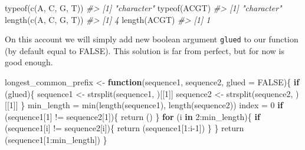\documentclass[
]{book}
\newenvironment{Shaded}{\begin{snugshade}}{\end{snugshade}}
\newcommand{\AttributeTok}[1]{\textcolor[rgb]{0.77,0.63,0.00}{#1}}
\newcommand{\CommentTok}[1]{\textcolor[rgb]{0.56,0.35,0.01}{\textit{#1}}}
\newcommand{\ConstantTok}[1]{\textcolor[rgb]{0.00,0.00,0.00}{#1}}
\newcommand{\ControlFlowTok}[1]{\textcolor[rgb]{0.13,0.29,0.53}{\textbf{#1}}}
\newcommand{\DecValTok}[1]{\textcolor[rgb]{0.00,0.00,0.81}{#1}}
\newcommand{\FunctionTok}[1]{\textcolor[rgb]{0.00,0.00,0.00}{#1}}
\newcommand{\NormalTok}[1]{#1}
\newcommand{\OtherTok}[1]{\textcolor[rgb]{0.56,0.35,0.01}{#1}}
\newcommand{\SpecialCharTok}[1]{\textcolor[rgb]{0.00,0.00,0.00}{#1}}
\newcommand{\StringTok}[1]{\textcolor[rgb]{0.31,0.60,0.02}{#1}}
\begin{document}
\begin{Shaded}
\begin{Highlighting}[]
\FunctionTok{typeof}\NormalTok{(}\FunctionTok{c}\NormalTok{(}\StringTok{\textquotesingle{}A\textquotesingle{}}\NormalTok{, }\StringTok{\textquotesingle{}C\textquotesingle{}}\NormalTok{, }\StringTok{\textquotesingle{}G\textquotesingle{}}\NormalTok{, }\StringTok{\textquotesingle{}T\textquotesingle{}}\NormalTok{))}
\CommentTok{\#\textgreater{} [1] "character"}
\FunctionTok{typeof}\NormalTok{(}\StringTok{\textquotesingle{}ACGT\textquotesingle{}}\NormalTok{)}
\CommentTok{\#\textgreater{} [1] "character"}
\FunctionTok{length}\NormalTok{(}\FunctionTok{c}\NormalTok{(}\StringTok{\textquotesingle{}A\textquotesingle{}}\NormalTok{, }\StringTok{\textquotesingle{}C\textquotesingle{}}\NormalTok{, }\StringTok{\textquotesingle{}G\textquotesingle{}}\NormalTok{, }\StringTok{\textquotesingle{}T\textquotesingle{}}\NormalTok{))}
\CommentTok{\#\textgreater{} [1] 4}
\FunctionTok{length}\NormalTok{(}\StringTok{\textquotesingle{}ACGT\textquotesingle{}}\NormalTok{)}
\CommentTok{\#\textgreater{} [1] 1}
\end{Highlighting}
\end{Shaded}

On this account we will simply add new boolean argument \texttt{glued} to our function (by default equal to FALSE). This solution is far from perfect, but for now is good enough.

\begin{Shaded}
\begin{Highlighting}[]
\NormalTok{longest\_common\_prefix }\OtherTok{\textless{}{-}} \ControlFlowTok{function}\NormalTok{(sequence1, sequence2, }\AttributeTok{glued =} \ConstantTok{FALSE}\NormalTok{)\{}
  \ControlFlowTok{if}\NormalTok{ (glued)\{}
\NormalTok{    sequence1 }\OtherTok{\textless{}{-}} \FunctionTok{strsplit}\NormalTok{(sequence1, }\StringTok{\textquotesingle{}\textquotesingle{}}\NormalTok{)[[}\DecValTok{1}\NormalTok{]]}
\NormalTok{    sequence2 }\OtherTok{\textless{}{-}} \FunctionTok{strsplit}\NormalTok{(sequence2, }\StringTok{\textquotesingle{}\textquotesingle{}}\NormalTok{)[[}\DecValTok{1}\NormalTok{]]}
\NormalTok{  \}}
\NormalTok{  min\_length }\OtherTok{=} \FunctionTok{min}\NormalTok{(}\FunctionTok{length}\NormalTok{(sequence1), }\FunctionTok{length}\NormalTok{(sequence2))}
\NormalTok{  index }\OtherTok{=} \DecValTok{0}
  \ControlFlowTok{if}\NormalTok{ (sequence1[}\DecValTok{1}\NormalTok{] }\SpecialCharTok{!=}\NormalTok{ sequence2[}\DecValTok{1}\NormalTok{])\{}
    \FunctionTok{return}\NormalTok{ (}\StringTok{\textquotesingle{}\textquotesingle{}}\NormalTok{)}
\NormalTok{  \}}
  \ControlFlowTok{for}\NormalTok{ (i }\ControlFlowTok{in} \DecValTok{2}\SpecialCharTok{:}\NormalTok{min\_length)\{}
    \ControlFlowTok{if}\NormalTok{ (sequence1[i] }\SpecialCharTok{!=}\NormalTok{ sequence2[i])\{}
      \FunctionTok{return}\NormalTok{ (sequence1[}\DecValTok{1}\SpecialCharTok{:}\NormalTok{i}\DecValTok{{-}1}\NormalTok{])}
\NormalTok{    \}}
\NormalTok{  \}}
  \FunctionTok{return}\NormalTok{ (sequence1[}\DecValTok{1}\SpecialCharTok{:}\NormalTok{min\_length])}
\NormalTok{\}}
\end{Highlighting}
\end{Shaded}
\end{document}
